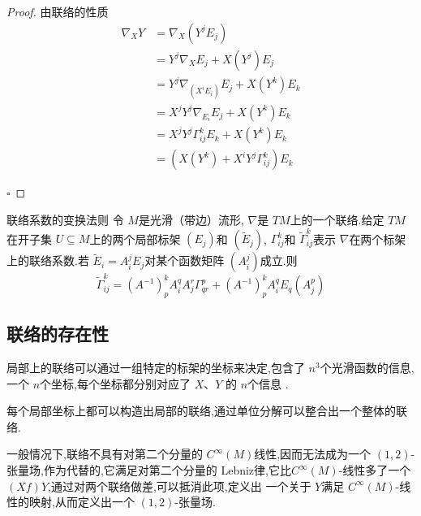 \documentclass[../../几何与拓扑.tex]{subfiles}
\begin{document}
\begin{proof}
    由联络的性质 \[
    \begin{aligned}
    \nabla _{X}Y & =  \nabla _{X} \left( Y^{j}E_{j} \right)\\ 
     & = Y^{j}  \nabla _{X}E_{j}+ X\left( Y^{j} \right)  E_{j}\\ 
      & =  Y^{j}  \nabla _{\left( X^{i}E_{i} \right) }E_{j}+ X\left( Y^{k} \right)E_{k} \\ 
       & =  X^{j}Y^{j} \nabla _{E_{i}}E_{j}+ X\left( Y^{k} \right)E_{k}\\ 
        & =  X^{j}Y^{j} \Gamma _{ij}^{k}E_{k} + X\left( Y^{k} \right)E_{k}\\ 
         & =  \left( X\left( Y^{k} \right)+  X^{i}Y^{j} \Gamma _{ij}^{k}  \right)E_{k}  
    \end{aligned}
    \]

    \hfill $\square$
\end{proof}

\begin{proposition}{联络系数的变换法则}
    令 \(  M  \)是光滑（带边）流形, \(   \nabla   \)是 \(  TM  \)上的一个联络.给定 \(  TM  \)在开子集 \(  U\subseteq M  \)上的两个局部标架
     \(  \left( E_{j} \right)   \)和 \(  \left( \tilde{E}_{j} \right)   \), \(   \Gamma _{ij}^{k}  \)和 \(   \tilde{\Gamma} _{ij}^{k}  \)表示 \(   \nabla   \)在两个标架上的联络系数.若 \(  \tilde{E}_{i} =  A_{i}^{j}E_{j}\)对某个函数矩阵 \(  \left( A_{i}^{j} \right)   \)成立.则 \[
      \tilde{\Gamma} _{ij}^{k} =  \left( A^{-1}  \right)_{p}^{k}A_{i}^{q}A_{j}^{r} \Gamma _{qr}^{p}+ \left( A^{-1}  \right)_{p}^{k} A_{i}^{q} E_{q}\left( A_{j}^{p} \right)  
     \]      
\end{proposition}

\subsection{联络的存在性}

局部上的联络可以通过一组特定的标架的坐标来决定,包含了  \(  n^{3}  \)个光滑函数的信息,一个 \(  n  \)个坐标,每个坐标都分别对应了 \(  X  \)、\(  Y  \)  的 \(  n  \)个信息   . 

每个局部坐标上都可以构造出局部的联络,通过单位分解可以整合出一个整体的联络.

一般情况下,联络不具有对第二个分量的 \(  C^{\infty}\left( M \right)   \)线性,因而无法成为一个 \(  \left( 1,2 \right)   \)- 张量场,作为代替的,它满足对第二个分量的
Lebniz律,它比\(  C^{\infty}\left( M \right)   \)-线性多了一个 \(  \left( Xf \right)Y   \),通过对两个联络做差,可以抵消此项,定义出
一个关于 \(  Y  \)满足 \(  C^{\infty}\left( M \right)   \)-线性的映射,从而定义出一个 \(  \left( 1,2 \right)   \)-张量场.     
\end{document}
